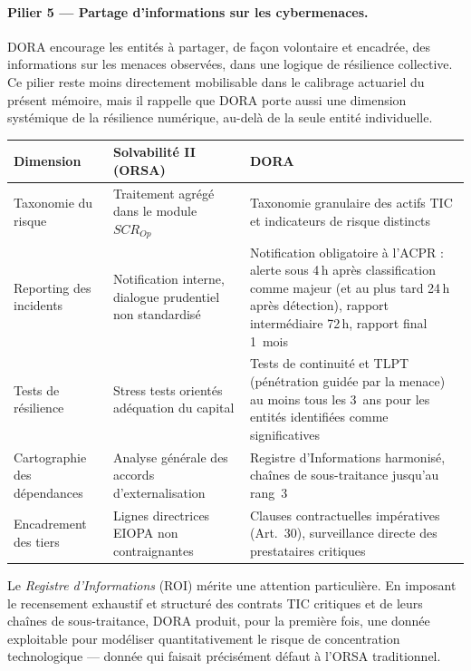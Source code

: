 \documentclass[11pt,a4paper]{article}
\theoremstyle{navystyle}
\theoremstyle{navydef}
\begin{document}
\paragraph{Pilier 5 --- Partage d'informations sur les cybermenaces.} DORA
encourage les entités à partager, de façon volontaire et encadrée, des
informations sur les menaces observées, dans une logique de résilience
collective. Ce pilier reste moins directement mobilisable dans le calibrage
actuariel du présent mémoire, mais il rappelle que DORA porte aussi une
dimension systémique de la résilience numérique, au-delà de la seule
entité individuelle.

\begin{center}
\renewcommand{\arraystretch}{1.3}
\begin{tabular}{>{\raggedright}p{3cm} >{\raggedright}p{5cm} >{\raggedright\arraybackslash}p{5.5cm}}
\toprule
\rowcolor{lightblue}
\textbf{Dimension} & \textbf{Solvabilité II (ORSA)} & \textbf{DORA} \\
\midrule
Taxonomie du risque & Traitement agrégé dans le module $SCR_{Op}$ &
Taxonomie granulaire des actifs TIC et indicateurs de risque distincts \\
Reporting des incidents & Notification interne, dialogue prudentiel non standardisé &
Notification obligatoire à l'ACPR : alerte sous 4\,h après classification comme majeur
(et au plus tard 24\,h après détection), rapport intermédiaire 72\,h,
rapport final 1~mois \\
Tests de résilience & Stress tests orientés adéquation du capital &
Tests de continuité et TLPT (pénétration guidée par la menace) au moins tous les 3~ans
pour les entités identifiées comme significatives \\
Cartographie des dépendances & Analyse générale des accords d'externalisation &
Registre d'Informations harmonisé, chaînes de sous-traitance jusqu'au rang~3 \\
Encadrement des tiers & Lignes directrices EIOPA non contraignantes &
Clauses contractuelles impératives (Art.~30), surveillance directe des prestataires
critiques \\
\bottomrule
\end{tabular}
\end{center}

Le \emph{Registre d'Informations} (ROI) mérite une attention particulière. En imposant
le recensement exhaustif et structuré des contrats TIC critiques et de leurs chaînes de
sous-traitance, DORA produit, pour la première fois, une donnée exploitable pour modéliser
quantitativement le risque de concentration technologique --- donnée qui faisait
précisément défaut à l'ORSA traditionnel.
\end{document}
